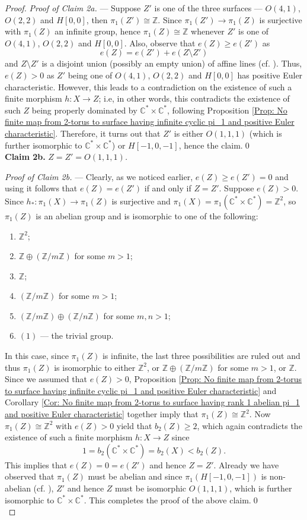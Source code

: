 \documentclass[12pt,reqno,twoside]{amsart}
\theoremstyle{definition}
\numberwithin{equation}{section}
\newcommand{\C}{\mathbb{C}}
\newcommand{\Z}{\mathbb{Z}}
\begin{document}
\begin{proof}
    {\it Proof of Claim 2a.} --- Suppose $Z'$ is one of the three surfaces --- $O(4,1)$, $O(2,2)$ and $H[0,0]$, then $\pi_1(Z')\cong \Z$. Since $\pi_1(Z') \to \pi_1(Z)$ is surjective with $\pi_1(Z)$ an infinite group, hence $\pi_1(Z)\cong \Z$ whenever $Z'$ is one of $O(4,1)$, $O(2,2)$ and $H[0,0]$. Also, observe that $e(Z)\geq e(Z')$ as $$e(Z)= e(Z')+e(Z\setminus Z')$$ and $Z\setminus Z'$ is a disjoint union (possibly an empty union) of affine lines (cf. \cite[Lemma 1.4]{Koj1999}). Thus, $e(Z) > 0$ as $Z'$ being one of $O(4,1)$, $O(2,2)$ and $H[0,0]$ has positive Euler characteristic. However, this leads to a contradiction on the existence of such a finite morphism $h: X \to Z$; i.e, in other words, this contradicts the existence of such $Z$ being properly dominated by $\C^*\times \C^*$, following Proposition \ref{Prop: No finite map from 2-torus to surface having infinite cyclic pi_1 and positive Euler characteristic}. Therefore, it turns out that $Z'$ is either $O(1,1,1)$ (which is further isomorphic to $\C^*\times \C^*$) or $H[-1,0,-1]$, hence the claim.\qed\\
    
    {\bf Claim 2b.} \emph{$Z=Z'=O(1,1,1)$.}
    \medskip
    
    {\it Proof of Claim 2b.} --- Clearly, as we noticed earlier, $e(Z) \geq e(Z')=0$ and using \cite[Lemma 1.4]{Koj1999} it follows that $e(Z) = e(Z')$ if and only if $Z=Z'$. Suppose $e(Z)>0$. Since $h_\ast: \pi_1(X) \to \pi_1(Z)$ is surjective and $\pi_1(X)=\pi_1(\C^*\times \C^*)=\Z^2$, so $\pi_1(Z)$ is an abelian group and is isomorphic to one of the following:
    \begin{enumerate}
    	\item $\Z^2$;
    	\item $\Z \oplus (\Z/m\Z)$ for some $m > 1$;
    	\item $\Z$;
        \item $(\Z/m\Z)$ for some $m>1$;
    	\item $(\Z/m\Z) \oplus (\Z/n\Z)$ for some $m, n >1$;
        \item $(1)$ --- the trivial group.
    \end{enumerate}  
    In this case, since $\pi_1(Z)$ is infinite, the last three possibilities are ruled out and thus $\pi_1(Z)$ is isomorphic to either $\Z^2$, or $\Z \oplus (\Z/m\Z)$ for some $m > 1$, or $\Z$. Since we assumed that $e(Z)>0$, Proposition \ref{Prop: No finite map from 2-torus to surface having infinite cyclic pi_1 and positive Euler characteristic} and Corollary \ref{Cor: No finite map from 2-torus to surface having rank 1 abelian pi_1 and positive Euler characteristic} together imply that $\pi_1(Z)\cong \Z^2$. Now $\pi_1(Z)\cong \Z^2$ with $e(Z)>0$ yield that $b_2(Z) \geq 2$, which again contradicts the existence of such a finite morphism $h: X \to Z$ since $$1=b_2(\C^*\times \C^*)=b_2(X) < b_2(Z).$$ This implies that $e(Z)=0=e(Z')$ and hence $Z=Z'$. Already we have observed that $\pi_1(Z)$ must be abelian and since $\pi_1(H[-1,0,-1])$ is non-abelian (cf. \cite[Table 1]{Koj1999}), $Z'$ and hence $Z$ must be isomorphic $O(1,1,1)$, which is further isomorphic to $\C^*\times \C^*$. This completes the proof of the above claim.\qed\\
    		

\end{proof}
\end{document}
